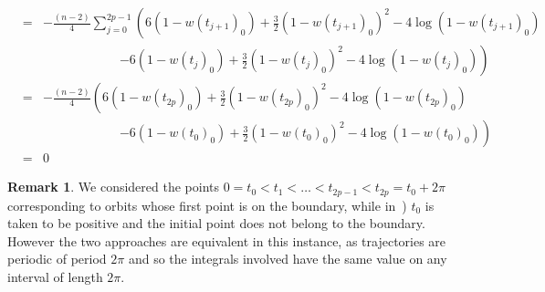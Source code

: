 \documentclass[11pt,a4paper,times]{amsart}
\theoremstyle{plain}
\theoremstyle{definition}
\newtheorem{remark}{Remark}[section]
\numberwithin{equation}{section}
\begin{document}
{\begin{eqnarray*}
 &=&  -\frac{(n-2)}{4}\sum_{j=0}^{2p-1}\left( 6(1-w(t_{j+1})_0)+\frac{3}{2}(1-w(t_{j+1})_0)^2-4\log(1-w(t_{j+1})_0)\right.\nonumber\\
&& \quad\quad\quad\quad\quad\quad\left.-6(1-w(t_{j})_0)+\frac{3}{2}(1-w(t_{j})_0)^2-4\log(1-w(t_{j})_0)\right)\nonumber\\
&=&-\frac{(n-2)}{4}\left( 6(1-w(t_{2p})_0)+\frac{3}{2}(1-w(t_{2p})_0)^2-4\log(1-w(t_{2p})_0)\right.\nonumber\\
&&  \quad\quad\quad\quad\quad\quad\left.-6(1-w(t_{0})_0)+\frac{3}{2}(1-w(t_{0})_0)^2-4\log(1-w(t_{0})_0)\right)\nonumber\\
&=& 0 \nonumber
\end{eqnarray*}
%
\begin{remark}
We considered the points  $0=t_0<t_1<\ldots<t_{2p-1}<t_{2p}=t_{0}+2\pi$ corresponding to orbits whose first point is on the boundary, while
in~\cite[p.33]{sava}) $t_{0}$ is taken to be positive and the initial point does not belong to the boundary. However the two approaches
are equivalent in this instance, as trajectories are periodic of period $2\pi$ and so the integrals involved have the same value on any interval
of length $2\pi$.
\end{remark}
%

}
\end{document}
